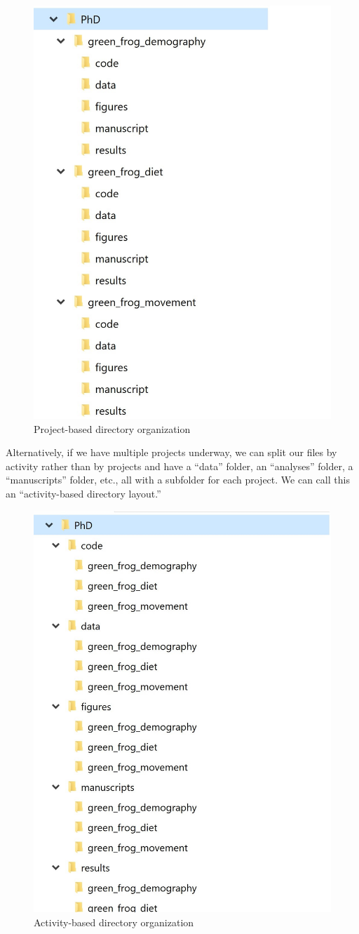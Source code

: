 \documentclass[
]{book}
\begin{document}
\begin{figure}

{\centering \includegraphics[width=0.5\linewidth]{img/project-based-directory-organization} 

}

\caption{Project-based directory organization}\label{fig:proj-based}
\end{figure}

Alternatively, if we have multiple projects underway, we can split our files by activity rather than by projects and have a ``data'' folder, an ``analyses'' folder, a ``manuscripts'' folder, etc., all with a subfolder for each project. We can call this an ``activity-based directory layout.''

\begin{figure}

{\centering \includegraphics[width=0.5\linewidth]{img/activity-based-directory-organization} 

}

\caption{Activity-based directory organization}\label{fig:act-based}
\end{figure}
\end{document}
